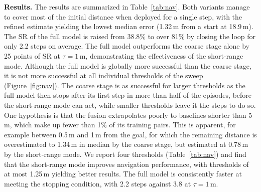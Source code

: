 \noindent \textbf{Results.} The results are summarized in Table~\ref{tab:nav}. Both variants manage to cover most of the initial distance when deployed for a single step, with the refined estimate yielding the lowest median error (1.32\,m from a start at 18.9\,m). The SR of the full model is raised from 38.8\% to over 81\% by closing the loop for only 2.2 steps on average. The full model outperforms the coarse stage alone by 25 points of SR at $\tau = 1$\,m, demonstrating the effectiveness of the short-range mode. Although the full model is globally more successful than the coarse stage, it is not more successful at all individual thresholds of the sweep (Figure~\ref{fig:nav}). The coarse stage is as successful for larger thresholds as the full model then stops after its first step in more than half of the episodes, before the short-range mode can act, while smaller thresholds leave it the steps to do so. One hypothesis is that the fusion extrapolates poorly to baselines shorter than 5\,m, which make up fewer than 1\% of its training pairs. This is apparent, for example between 0.5\,m and 1\,m from the goal, for which the remaining distance is overestimated to 1.34\,m in median by the coarse stage, but estimated at 0.78\,m by the short-range mode. We report four thresholds (Table~\ref{tab:nav}) and find that the short-range mode improves navigation performance, with thresholds of at most 1.25\,m yielding better results. The full model is consistently faster at meeting the stopping condition, with 2.2 steps against 3.8 at $\tau = 1$\,m.


